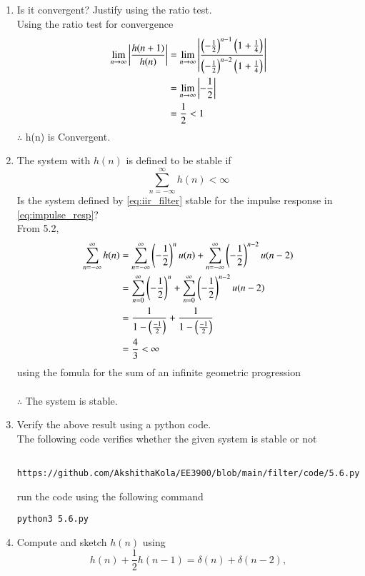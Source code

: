 \documentclass[journal,12pt,twocolumn]{IEEEtran}
\renewcommand\thesection{\arabic{section}}
\begin{document}
\begin{enumerate}[label=\thesection.\arabic*]
\item Is it convergent? Justify using the ratio test.\\
\solution Using the ratio test for convergence
\begin{align}
\lim_{n \to \infty} \left\vert\frac{h(n+1)}{h(n)}\right\vert &= \lim_{n \to \infty} \left\vert\frac{\left(-\frac{1}{2}\right)^{n-1} \left(1+\frac{1}{4}\right)}{\left(-\frac{1}{2}\right)^{n-2}\left(1+\frac{1}{4}\right)}\right\vert\\ &= \lim_{n \to \infty} \left\vert-\frac{1}{2}\right\vert\\ &= \frac{1}{2}<1
\end{align}
$\therefore$ h(n) is Convergent.
\item The system with $h(n)$ is defined to be stable if
\begin{equation}
\sum_{n=-\infty}^{\infty}h(n) < \infty
\end{equation}
Is the system defined by \eqref{eq:iir_filter} stable for the impulse response in \eqref{eq:impulse_resp}?\\
\solution From 5.2,
\begin{align}
\sum_{n=-\infty}^{\infty}h(n) &= \sum_{n=-\infty}^{\infty}\left(-\frac{1}{2}\right)^{n}u(n) + \sum_{n=-\infty}^{\infty}\left(-\frac{1}{2}\right)^{n-2}u(n-2)\\ &= \sum_{n=0}^{\infty}\left(-\frac{1}{2}\right)^{n} + \sum_{n=0}^{\infty}\left(-\frac{1}{2}\right)^{n-2}u(n-2)\\ &= \frac{1}{1-\left(\frac{-1}{2}\right)} + \frac{1}{1-\left(\frac{-1}{2}\right)}\\ &= \frac{4}{3} < \infty
\end{align}
using the fomula for the sum of an infinite geometric progression\\\\
$\therefore$ The system is stable.
\item Verify the above result using a python code.\\
\solution The following code verifies whether the given system is stable or not
\begin{lstlisting}
	https://github.com/AkshithaKola/EE3900/blob/main/filter/code/5.6.py
\end{lstlisting}
run the code using the following command
\begin{lstlisting}
python3 5.6.py
\end{lstlisting}
\item 
Compute and sketch $h(n)$ using 
\begin{equation}
\label{eq:iir_filter_h}
h(n) + \frac{1}{2}h(n-1) = \delta(n) + \delta(n-2), 
\end{equation}

\end{enumerate}
\end{document}
